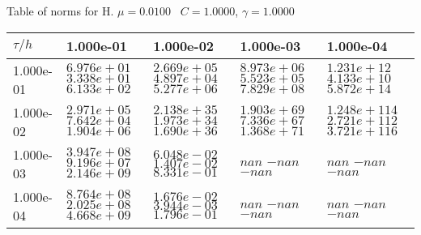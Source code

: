 \begin{center}
Table of norms for H. $\mu = 0.0100$ \, $C = 1.0000$, $\gamma = 1.0000$
  
\begin{tabular}{|p{1in}|p{1in}|p{1in}|p{1in}|p{1in}|} \hline
$\tau / h$ &1.000e-01 &1.000e-02 &1.000e-03 &1.000e-04 \\ \hline 
1.000e-01 & $6.976e+01$  $3.338e+01$  $6.133e+02$  & $2.669e+05$  $4.897e+04$  $5.277e+06$  & $8.973e+06$  $5.523e+05$  $7.829e+08$  & $1.231e+12$  $4.133e+10$  $5.872e+14$  \\ \hline 
1.000e-02 & $2.971e+05$  $7.642e+04$  $1.904e+06$  & $2.138e+35$  $1.973e+34$  $1.690e+36$  & $1.903e+69$  $7.336e+67$  $1.368e+71$  & $1.248e+114$  $2.721e+112$  $3.721e+116$  \\ \hline 
1.000e-03 & $3.947e+08$  $9.196e+07$  $2.146e+09$  & $6.048e-02$  $1.407e-02$  $8.331e-01$  & $nan$  $-nan$  $-nan$  & $nan$  $-nan$  $-nan$  \\ \hline 
1.000e-04 & $8.764e+08$  $2.025e+08$  $4.668e+09$  & $1.676e-02$  $3.944e-03$  $1.796e-01$  & $nan$  $-nan$  $-nan$  & $nan$  $-nan$  $-nan$  \\ \hline 

\end{tabular}\\[20pt]
\end{center}
